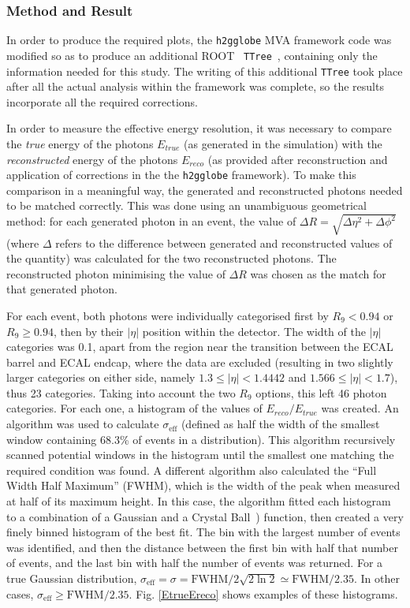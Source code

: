 \documentclass[10pt]{article}
\begin{document}
\subsubsection{Method and Result}

In order to produce the required plots, the \texttt{h2gglobe} MVA framework code was modified so as to produce an additional ROOT~\cite{root} \texttt{TTree}~\cite{TTree}, containing only the information needed for this study. The writing of this additional \texttt{TTree} took place after all the actual analysis within the framework was complete, so the results incorporate all the required corrections.

In order to measure the effective energy resolution, it was necessary to compare the \textit{true} energy of the photons $E_{true}$ (as generated in the simulation) with the \textit{reconstructed} energy of the photons $E_{reco}$ (as provided after reconstruction and application of corrections in the the \texttt{h2gglobe} framework). To make this comparison in a meaningful way, the generated and reconstructed photons needed to be matched correctly. This was done using an unambiguous geometrical method: for each generated photon in an event, the value of $\Delta R = \sqrt{\Delta \eta^2 + \Delta \phi^2}$ (where $\Delta $ refers to the difference between generated and reconstructed values of the quantity) was calculated for the two reconstructed photons. The reconstructed photon minimising the value of $\Delta R$ was chosen as the match for that generated photon.

For each event, both photons were individually categorised first by $R_{9} <0.94$ or $R_{9} \geq 0.94$, then by their $|\eta|$ position within the detector. The width of the $|\eta|$ categories was 0.1, apart from the region near the transition between the ECAL barrel and ECAL endcap, where the data are excluded (resulting in two slightly larger categories on either side, namely $ 1.3 \leq |\eta| < 1.4442 $ and $1.566 \leq |\eta| < 1.7$), thus 23 categories. Taking into account the two $R_{9}$ options, this left 46 photon categories. For each one, a histogram of the values of $E_{reco}/E_{true}$ was created. An algorithm was used to calculate $\sigma_{\text{eff}}$ (defined as half the width of the smallest window containing 68.3\% of events in a distribution). This algorithm recursively scanned potential windows in the histogram until the smallest one matching the required condition was found. A different algorithm also calculated the ``Full Width Half Maximum'' (FWHM), which is the width of the peak when measured at half of its maximum height. In this case, the algorithm fitted each histogram to a combination of a Gaussian and a Crystal Ball~\cite{crystalball}) function, then created a very finely binned histogram of the best fit. The bin with the largest number of events was identified, and then the distance between the first bin with half that number of events, and the last bin with half the number of events was returned. For a true Gaussian distribution, $\sigma_{\text{eff}} = \sigma = \text{FWHM}/2\sqrt{2\ln2} \simeq \text{FWHM}/2.35$. In other cases, $\sigma_{\text{eff}} \geq \text{FWHM}/2.35$. Fig. \ref{EtrueEreco} shows examples of these histograms. 
\end{document}
